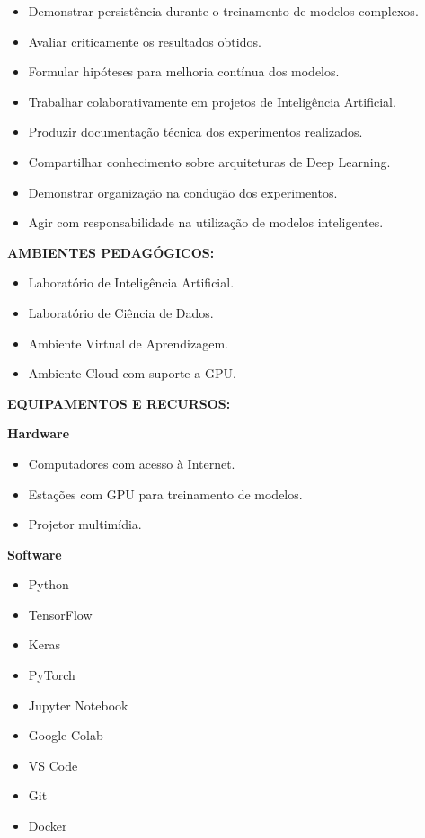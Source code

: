 \begin{itemize}
\item Demonstrar persistência durante o treinamento de modelos complexos.
\item Avaliar criticamente os resultados obtidos.
\item Formular hipóteses para melhoria contínua dos modelos.
\item Trabalhar colaborativamente em projetos de Inteligência Artificial.
\item Produzir documentação técnica dos experimentos realizados.
\item Compartilhar conhecimento sobre arquiteturas de Deep Learning.
\item Demonstrar organização na condução dos experimentos.
\item Agir com responsabilidade na utilização de modelos inteligentes.
\end{itemize}

\textbf{AMBIENTES PEDAGÓGICOS:}

\begin{itemize}
\item Laboratório de Inteligência Artificial.
\item Laboratório de Ciência de Dados.
\item Ambiente Virtual de Aprendizagem.
\item Ambiente Cloud com suporte a GPU.
\end{itemize}

\textbf{EQUIPAMENTOS E RECURSOS:}

\textbf{Hardware}

\begin{itemize}
\item Computadores com acesso à Internet.
\item Estações com GPU para treinamento de modelos.
\item Projetor multimídia.
\end{itemize}

\textbf{Software}

\begin{itemize}
\item Python
\item TensorFlow
\item Keras
\item PyTorch
\item Jupyter Notebook
\item Google Colab
\item VS Code
\item Git
\item Docker
\end{itemize}
